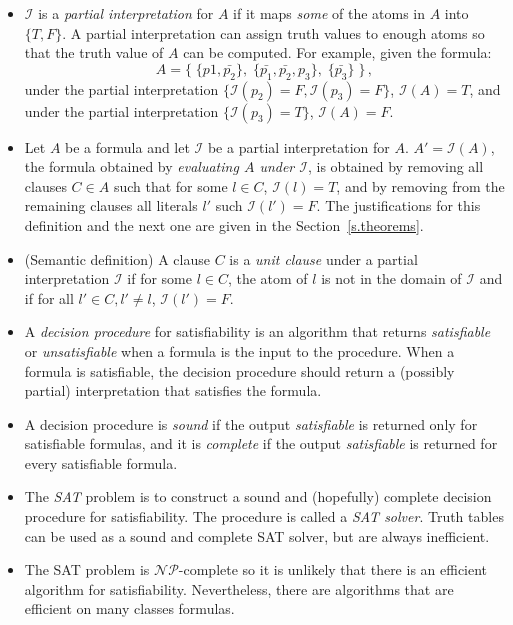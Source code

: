 \documentclass[11pt]{report}
\begin{document}
\begin{itemize}
\item $\mathcal{I}$ is a \emph{partial interpretation} for $A$ if it
maps \emph{some} of the atoms in $A$ into $\{T,F\}$.
A partial interpretation can assign truth values to enough atoms so that the truth value of $A$ can be computed. For example, given the formula:
\[
A=\{\;\{p1, \bar{p_2}\}, \; \{\bar{p_1}, \bar{p_2}, p_3\}, \; \{\bar{p_3}\}\;\}\,,
\]
under the partial interpretation $\{\mathcal{I}(p_2)=F, \mathcal{I}(p_3)=F\}$, $\mathcal{I}(A)=T$, and under the partial interpretation $\{\mathcal{I}(p_3)=T\}$, $\mathcal{I}(A)=F$.

\item Let $A$ be a formula and let $\mathcal{I}$ be a partial
interpretation for $A$. $A'=\mathcal{I}(A)$, the formula obtained by
\emph{evaluating $A$ under $\mathcal{I}$}, is obtained by removing all
clauses $C\in A$ such that for some $l\in C$, $\mathcal{I}(l)=T$, and by
removing from the remaining clauses all literals $l'$ such
$\mathcal{I}(l')=F$. The justifications for this definition and the next one are given in the Section~\ref{s.theorems}.

\item (Semantic definition) A clause $C$ is a \emph{unit clause} under a partial interpretation $\mathcal{I}$ if for some $l\in C$, the atom of $l$ is not in the domain of $\mathcal{I}$ and if for all $l'\in C, l'\neq l$, $\mathcal{I}(l')=F$.

\item A \emph{decision procedure} for satisfiability is an algorithm that returns \emph{satisfiable} or \emph{unsatisfiable} when a formula is the input to the procedure. When a formula is satisfiable, the decision procedure should return a (possibly partial) interpretation that satisfies the formula.

\item A decision procedure is \emph{sound} if the output \emph{satisfiable} is returned only for satisfiable formulas, and it is \emph{complete} if the output \emph{satisfiable} is returned for every satisfiable formula.

\item The \emph{SAT} problem is to construct a sound and (hopefully) complete decision procedure for satisfiability. The procedure is called a \emph{SAT solver}. Truth tables can be used as a sound and complete SAT solver, but are always inefficient.

\item The SAT problem is $\mathcal{NP}$-complete so it is unlikely that there is an efficient algorithm for satisfiability. Nevertheless, there are algorithms that are efficient on many classes formulas.

\end{itemize}
\end{document}
